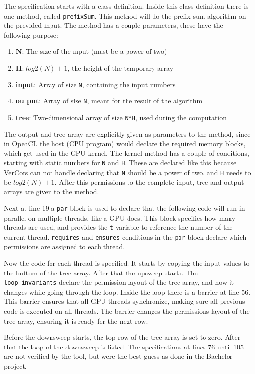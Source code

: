 \documentclass[a4paper]{article}
\newcommand{\code}[1]{\texttt{\small \color{inline}#1}} %
\begin{document}
The specification starts with a class definition. Inside this class definition there is one method, called \code{prefixSum}. This method will do the prefix sum algorithm on the provided input. The method has a couple parameters, these have the following purpose:
\begin{enumerate}
	\item \textbf{N}: The size of the input (must be a power of two)
	\item \textbf{H}: $log2(N)+1$, the height of the temporary array
	\item \textbf{input}: Array of size \code{N}, containing the input numbers
	\item \textbf{output}: Array of size \code{N}, meant for the result of the algorithm
	\item \textbf{tree}: Two-dimensional array of size \code{N*H}, used during the computation
\end{enumerate}

The output and tree array are explicitly given as parameters to the method, since in OpenCL the host (CPU program) would declare the required memory blocks, which get used in the GPU kernel. The kernel method has a couple of conditions, starting with static numbers for \code{N} and \code{H}. These are declared like this because VerCors can not handle declaring that \code{N} should be a power of two, and \code{H} needs to be $log2(N)+1$. After this permissions to the complete input, tree and output arrays are given to the method.

Next at line 19 a \code{par} block is used to declare that the following code will run in parallel on multiple threads, like a GPU does. This block specifies how many threads are used, and provides the \code{t} variable to reference the number of the current thread. \code{requires} and \code{ensures} conditions in the \code{par} block declare which permissions are assigned to each thread.

Now the code for each thread is specified. It starts by copying the input values to the bottom of the tree array. After that the upsweep starts. The \code{loop\_invariants} declare the permission layout of the tree array, and how it changes while going through the loop. Inside the loop there is a barrier at line 56. This barrier ensures that all GPU threads synchronize, making sure all previous code is executed on all threads. The barrier changes the permissions layout of the tree array, ensuring it is ready for the next row.

Before the downsweep starts, the top row of the tree array is set to zero. After that the loop of the downsweep is listed. The specifications at lines 76 until 105 are not verified by the tool, but were the best guess as done in the Bachelor project.
\end{document}
